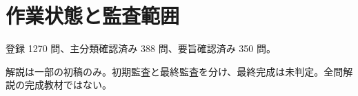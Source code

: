 \chapter{作業状態と監査範囲}
登録 1270 問、主分類確認済み 388 問、要旨確認済み 350 問。
\par 解説は一部の初稿のみ。初期監査と最終監査を分け、最終完成は未判定。全問解説の完成教材ではない。
